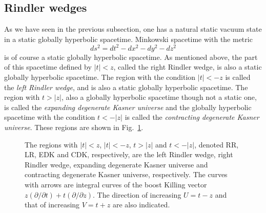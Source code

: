 \documentclass[12pt,nofootinbib,floatfix,aps,prd,showpacs,amsmath,amssymb,eqsecnum]{revtex4-2}
\begin{document}
\subsection{Rindler wedges}
\label{subsection:Rindler}

As we have seen in the previous subsection, one has a natural static 
vacuum state in a static globally hyperbolic spacetime.  
Minkowski spacetime with the metric
\begin{equation}
ds^2 = dt^2 - dx^2 - dy^2 - dz^2
\end{equation}
is of course a static globally hyperbolic 
spacetime.  As mentioned above, 
the part of this
spacetime defined by $|t| < z$, 
called the right Rindler wedge, is also
a static globally hyperbolic spacetime.  The
region with the condition $|t| < -z$ is called 
the {\em left Rindler wedge},
and is also a static globally hyperbolic spacetime.  The region with 
$t > |z|$, also a globally hyperbolic spacetime though not a static one, 
is called the {\em expanding
degenerate Kasner universe} and the globally hyperbolic spacetime with the condition 
$t < -|z|$ is called the {\em contracting degenerate Kasner universe}.  
These regions are shown
in Fig.~\ref{MilneRindler}. 
\begin{figure}[t]
\caption{\label{MilneRindler} The regions with $|t|<z$, $|t| < -z$,
$t>|z|$ and $t< -|z|$, denoted RR, LR, EDK and CDK, respectively, are
the left Rindler wedge, right Rindler wedge, expanding degenerate Kasner 
universe and
contracting degenerate Kasner universe, respectively.
The curves with arrows are integral
curves of the boost Killing vector $z(\partial/\partial t) +
t(\partial/\partial z)$.
The direction of increasing $U=t-z$ and that of
increasing $V=t+z$ are also indicated.}
\end{figure}
\end{document}
